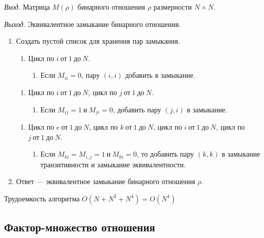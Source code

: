 \documentclass[bachelor, och, labwork]{shiza}
\begin{document}
\textit{Вход.} Матрица $M(\rho)$ бинарного отношения $\rho$ размерности
$N \times N$.

\textit{Выход.} Эквивалентное замыкание бинарного отношения.

\begin{enumerate}
    \item Создать пустой список для хранения пар замыкания.
    \begin{enumerate}[label=a)]
        \item Цикл по $i ~\text{от}~ 1 ~\text{до}~ N$.
        \begin{enumerate}[label=1.]\item Если $M_{ii} = 0$, пару $(i, i)$ добавить в замыкание.\end{enumerate} 
    \end{enumerate}

    \begin{enumerate}[label=b)]
        \item Цикл по $i ~\text{от}~ 1 ~\text{до}~ N$, цикл по $j ~\text{от}~ 1 ~\text{до}~ N$.
        \begin{enumerate}[label=1.]\item Если $M_{ij} = 1 ~\text{и}~ M_{ji} = 0$, добавить пару $(j, i)$
        в замыкание.\end{enumerate}        
    \end{enumerate}

    \begin{enumerate}[label=c)]
        \item Цикл по $e ~\text{от}~ 1 ~\text{до}~ N$, цикл по $k ~\text{от}~ 1 ~\text{до}~ N$, 
        цикл по $i ~\text{от}~ 1 ~\text{до}~ N$, цикл по $j ~\text{от}~ 1 ~\text{до}~ N$.
        \begin{enumerate}[label=1.]\item Если $M_{ki}=M_{i,j}=1 ~\text{и}~ M_{ki}=0$, то добавить пару
        $(k, k)$ в замыкание транзитивности и замыкание эквивалентности.\end{enumerate}
    \end{enumerate}
    \item Ответ --- эквивалентное замыкание бинарного отношения $\rho$.
\end{enumerate}
Трудоемкость алгоритма $O(N+N^2+N^4)=O(N^4)$

\subsection{Фактор-множество отношения}
\end{document}
